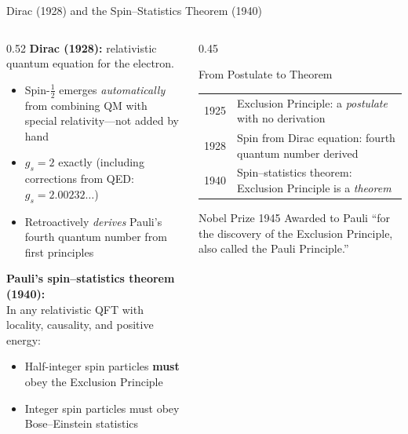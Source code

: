 \documentclass[aspectratio=169,12pt]{beamer}
\begin{document}
\begin{frame}[shrink=15]{Dirac (1928) and the Spin--Statistics Theorem (1940)}

\begin{columns}[T]
\begin{column}{0.52\textwidth}
\textbf{Dirac (1928):} relativistic quantum equation for the electron.
\medskip
\begin{itemize}
  \item Spin-$\tfrac{1}{2}$ emerges \emph{automatically} from combining
    QM with special relativity---not added by hand
  \item $g_s = 2$ exactly (including corrections from QED: $g_s = 2.00232\ldots$)
  \item Retroactively \emph{derives} Pauli's fourth quantum number
    from first principles
\end{itemize}

\bigskip
\textbf{Pauli's spin--statistics theorem (1940):}\\
In any relativistic QFT with locality,
causality, and positive energy:
\begin{itemize}
  \item Half-integer spin particles \textbf{must} obey the Exclusion Principle
  \item Integer spin particles must obey Bose--Einstein statistics
\end{itemize}
\end{column}
\begin{column}{0.45\textwidth}
\begin{block}{From Postulate to Theorem}
\begin{tabular}{p{1.5cm}p{4cm}}
\toprule
1925 & Exclusion Principle: a \emph{postulate} with no derivation \\
1928 & Spin from Dirac equation: fourth quantum number derived \\
1940 & Spin--statistics theorem: Exclusion Principle is a \emph{theorem} \\
\bottomrule
\end{tabular}
\end{block}

\bigskip
\begin{alertblock}{Nobel Prize 1945}
Awarded to Pauli ``for the discovery of
the Exclusion Principle, also called the
Pauli Principle.''
\end{alertblock}
\end{column}
\end{columns}

\end{frame}
\end{document}
